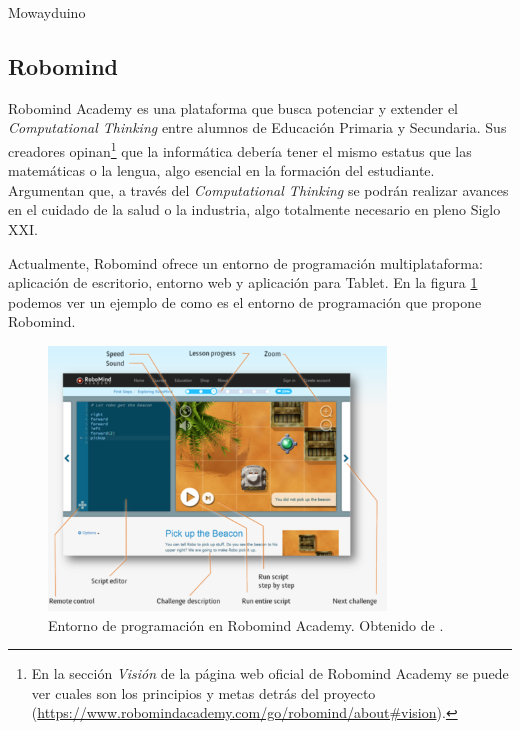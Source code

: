 Mowayduino



\subsection{Robomind}
\label{sec:robomind}


Robomind Academy\cite{robomind-web} es una plataforma que busca potenciar y extender el \emph{Computational Thinking} entre alumnos de Educación Primaria y Secundaria. Sus creadores opinan\footnote{En la sección \emph{Visión} de la página web oficial de Robomind Academy se puede ver cuales son los principios y metas detrás del proyecto (\url{https://www.robomindacademy.com/go/robomind/about#vision}).} que la informática debería tener el mismo estatus que las matemáticas o la lengua, algo esencial en la formación del estudiante. Argumentan que, a través del \emph{Computational Thinking} se podrán realizar avances en el cuidado de la salud o la industria, algo totalmente necesario en pleno Siglo XXI. 


Actualmente, Robomind ofrece un entorno de programación multiplataforma: aplicación de escritorio, entorno web y aplicación para Tablet. En la figura \ref{fig:robomind-entorno} podemos ver un ejemplo de como es el entorno de programación que propone Robomind.


\begin{figure}[!ht]
	\begin{centering}
		\includegraphics[width=0.8\textwidth]{images/robomind-entorno.png}
			\caption{Entorno de programación en Robomind Academy. Obtenido de \cite{robomind-web}.}
				\label{fig:robomind-entorno}
	\end{centering}
\end{figure}


